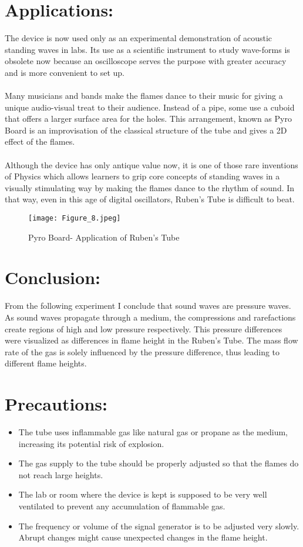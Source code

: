 \documentclass[12pt,a4paper]{article}
\begin{document}
\section{Applications:}
The device is now used only as an experimental demonstration of acoustic standing waves in labs. Its use as a scientific instrument to study wave-forms is obsolete now because an oscilloscope serves the purpose with greater accuracy and is more convenient to set up.\\
\\Many musicians and bands make the flames dance to their music for giving a unique audio-visual treat to their audience. Instead of a pipe, some use a cuboid that offers a larger surface area for the holes. This arrangement, known as Pyro Board is an improvisation of the classical structure of the tube and gives a 2D effect of the flames.\\
\\Although the device has only antique value now, it is one of those rare inventions of Physics which allows learners to grip core concepts of standing waves in a visually stimulating way by making the flames dance to the rhythm of sound. In that way, even in this age of digital oscillators, Ruben’s Tube is difficult to beat.
\begin{figure}[!ht]
	\begin{center}
		\texttt{[image: Figure\_8.jpeg]}
	\end{center}
	\caption{Pyro Board- Application of Ruben's Tube}
\end{figure}
\section{Conclusion:}
From the following experiment I conclude that sound waves are pressure waves. As sound waves propagate through a medium, the compressions and rarefactions create regions of high and low pressure respectively. This pressure differences were visualized as differences in flame height in the Ruben’s Tube. The mass flow rate of the gas is solely influenced by the pressure difference, thus leading to different flame heights.
\section{Precautions:}
\begin{itemize}
\item The tube uses inflammable gas like natural gas or propane as the medium, increasing its potential risk of explosion.
\item The gas supply to the tube should be properly adjusted so that the flames do not reach
large heights.
\item The lab or room where the device is kept is supposed to be very well ventilated to
prevent any accumulation of flammable gas.
\item The frequency or volume of the signal generator is to be adjusted very slowly. Abrupt
changes might cause unexpected changes in the flame height.
\end{itemize}
\end{document}
